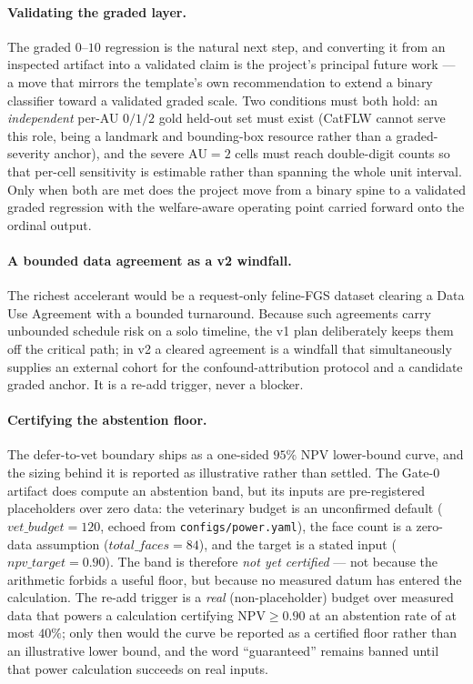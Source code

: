 \paragraph{Validating the graded layer.}
The graded $0$--$10$ regression is the natural next step, and converting it from
an inspected artifact into a validated claim is the project's principal future
work --- a move that mirrors the template's own recommendation to extend a binary
classifier toward a validated graded scale. Two conditions must both hold: an
\emph{independent} per-AU $0/1/2$ gold held-out set must exist (CatFLW
\cite{martvel2024catflw} cannot serve this role, being a landmark and
bounding-box resource rather than a graded-severity anchor), and the severe
$\mathrm{AU}{=}2$ cells must reach double-digit counts so that per-cell sensitivity
is estimable rather than spanning the whole unit interval. Only when both are met
does the project move from a binary spine to a validated graded regression with
the welfare-aware operating point carried forward onto the ordinal output.

\paragraph{A bounded data agreement as a v2 windfall.}
The richest accelerant would be a request-only feline-FGS dataset clearing a Data
Use Agreement with a bounded turnaround. Because such agreements carry unbounded
schedule risk on a solo timeline, the v1 plan deliberately keeps them off the
critical path; in v2 a cleared agreement is a windfall that simultaneously
supplies an external cohort for the confound-attribution protocol and a candidate
graded anchor. It is a re-add trigger, never a blocker.

\paragraph{Certifying the abstention floor.}
The defer-to-vet boundary ships as a one-sided $95\%$ NPV lower-bound curve, and
the sizing behind it is reported as illustrative rather than settled. The Gate-0
artifact does compute an abstention band, but its inputs are pre-registered
placeholders over zero data: the veterinary budget is an unconfirmed default
($\mathit{vet\_budget}{=}120$, echoed from \texttt{configs/power.yaml}), the
face count is a zero-data assumption ($\mathit{total\_faces}{=}84$), and the
target is a stated input ($\mathit{npv\_target}{=}0.90$). The band is therefore
\emph{not yet certified} --- not because the arithmetic forbids a useful floor,
but because no measured datum has entered the calculation. The re-add trigger is a
\emph{real} (non-placeholder) budget over measured data that powers a calculation
certifying $\mathrm{NPV} \geq 0.90$ at an abstention rate of at most $40\%$; only
then would the curve be reported as a certified floor rather than an illustrative
lower bound, and the word ``guaranteed'' remains banned until that power
calculation succeeds on real inputs.

